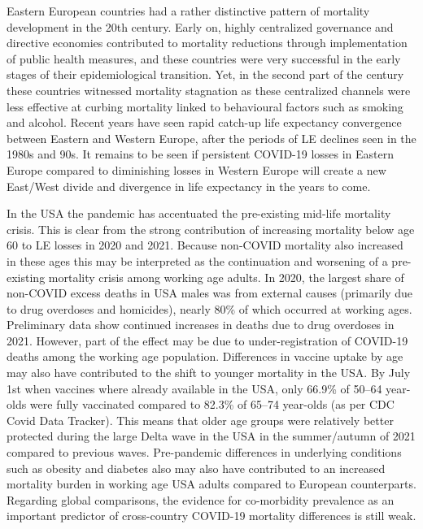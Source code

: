 \documentclass[12pt]{article}
\begin{document}
Eastern European countries had a rather distinctive pattern of mortality development in the 20th century. Early on, highly centralized governance and directive economies contributed to mortality reductions through implementation of public health measures, and these countries were very successful in the early stages of their epidemiological transition.\cite{Vishnevsky2015} Yet, in the second part of the century these countries witnessed mortality stagnation as these centralized channels were less effective at curbing mortality linked to behavioural factors such as smoking and alcohol.\cite{Omran1971, Vallin2005} Recent years have seen rapid catch-up life expectancy convergence between Eastern and Western Europe, after the periods of LE declines seen in the 1980s and 90s.\cite{Aburto2018, Timonin2016} It remains to be seen if persistent COVID-19 losses in Eastern Europe compared to diminishing losses in Western Europe will create a new East/West divide and divergence in life expectancy in the years to come.

In the USA the pandemic has accentuated the pre-existing mid-life mortality crisis. This is clear from the strong contribution of increasing mortality below age 60 to LE losses in 2020 and 2021. Because non-COVID mortality also increased in these ages this may be interpreted as the continuation and worsening of a pre-existing mortality crisis among working age adults.\cite{Woolf2019} In 2020, the largest share of non-COVID excess deaths in USA males was from external causes (primarily due to drug overdoses and homicides), nearly 80\% of which occurred at working ages.\cite{Glei2021}  Preliminary data show continued increases in deaths due to drug overdoses in 2021.\cite{Dyer2021} However, part of the effect may be due to under-registration of COVID-19 deaths among the working age population. Differences in vaccine uptake by age may also have contributed to the shift to younger mortality in the USA. By July 1st when vaccines where already available in the USA, only 66.9\% of 50--64 year-olds were fully vaccinated compared to 82.3\% of 65--74 year-olds (as per CDC Covid Data Tracker). This means that older age groups were relatively better protected during the large Delta wave in the USA in the summer/autumn of 2021 compared to previous waves. Pre-pandemic differences in underlying conditions such as obesity and diabetes also may also have contributed to an increased mortality burden in working age USA adults compared to European counterparts.\cite{Pongiglione2022} Regarding global comparisons, the evidence for co-morbidity prevalence as an important predictor of cross-country COVID-19 mortality differences is still weak.\cite{Thakur2021}
\end{document}
